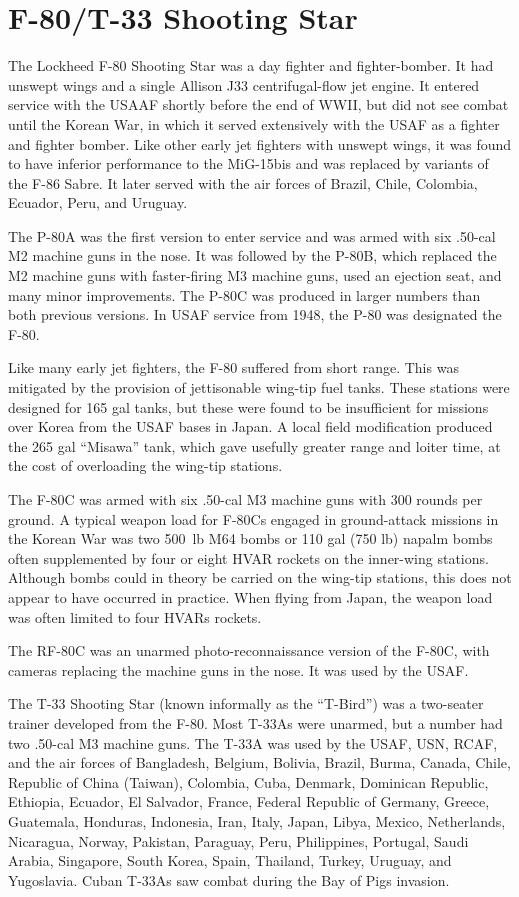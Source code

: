 \section*{F-80/T-33 Shooting Star}

The Lockheed F-80 Shooting Star was a day fighter and fighter-bomber. It had unswept wings and a single Allison J33 centrifugal-flow jet engine. It entered service with the USAAF shortly before the end of WWII, but did not see combat until the Korean War, in which it served extensively with the USAF as a fighter and fighter bomber. Like other early jet fighters with unswept wings, it was found to have inferior performance to the MiG-15bis and was replaced by variants of the F-86 Sabre. It later served with the air forces of Brazil, Chile, Colombia, Ecuador, Peru, and Uruguay.

The P-80A was the first version to enter service and was armed with six .50-cal M2 machine guns in the nose. It was followed by the P-80B, which replaced the M2 machine guns with faster-firing M3 machine guns, used an ejection seat, and many minor improvements. The P-80C was produced in larger numbers than both previous versions. In USAF service from 1948, the P-80 was designated the F-80.

Like many early jet fighters, the F-80 suffered from short range. This was mitigated by the provision of jettisonable wing-tip fuel tanks. These stations were designed for 165 gal tanks, but these were found to be insufficient for missions over Korea from the USAF bases in Japan. A local field modification produced the 265 gal “Misawa” tank, which gave usefully greater range and loiter time, at the cost of overloading the wing-tip stations.

The F-80C was armed with six .50-cal M3 machine guns with 300 rounds per ground. A typical weapon load for F-80Cs engaged in ground-attack missions in the Korean War was two 500~lb M64 bombs or 110 gal (750 lb) napalm bombs often supplemented by four or eight HVAR rockets on the inner-wing stations. Although bombs could in theory be carried on the wing-tip stations, this does not appear to have occurred in practice. When flying from Japan, the weapon load was often limited to four HVARs rockets.

The RF-80C was an unarmed photo-reconnaissance version of the F-80C, with cameras replacing the machine guns in the nose. It was used by the USAF.

The T-33 Shooting Star (known informally as the “T-Bird”) was a two-seater trainer developed from the F-80. Most T-33As were unarmed, but a number had two .50-cal M3 machine guns. The T-33A was used by the USAF, USN, RCAF, and the air forces of Bangladesh, Belgium, Bolivia, Brazil, Burma, Canada, Chile, Republic of China (Taiwan), Colombia, Cuba, Denmark, Dominican Republic, Ethiopia, Ecuador, El Salvador, France, Federal Republic of Germany, Greece, Guatemala, Honduras, Indonesia, Iran, Italy, Japan, Libya, Mexico, Netherlands, Nicaragua, Norway, Pakistan, Paraguay, Peru, Philippines, Portugal, Saudi Arabia, Singapore, South Korea, Spain, Thailand, Turkey, Uruguay, and Yugoslavia. Cuban T-33As saw combat during the Bay of Pigs invasion.

